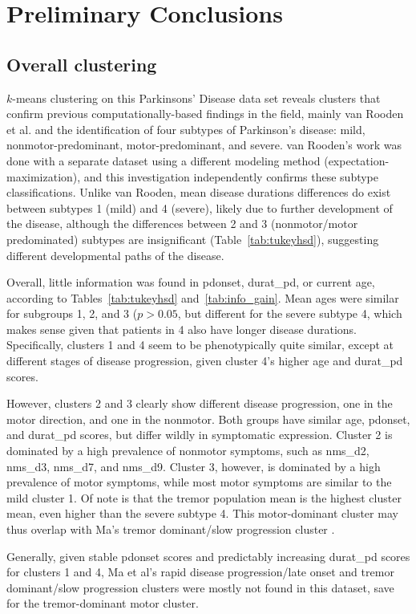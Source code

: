 \documentclass[10pt]{article}
\begin{document}
\section{Preliminary Conclusions}

\subsection{Overall clustering}
$k$-means clustering on this Parkinsons' Disease data set reveals clusters that
confirm previous computationally-based findings in the field, mainly van Rooden
et al. \cite{vanrooden10} and the identification of four subtypes of
Parkinson's disease: mild, nonmotor-predominant, motor-predominant, and severe.
van Rooden's work was done with a separate dataset using a different
modeling method (expectation-maximization), and this investigation
independently confirms these subtype classifications. Unlike van Rooden, mean
disease durations differences do exist between subtypes 1 (mild) and 4
(severe), likely due to further development of the disease, although the
differences between 2 and 3 (nonmotor/motor predominated) subtypes are
insignificant (Table~\ref{tab:tukeyhsd}), suggesting different developmental paths of the disease.

Overall, little information was found in pdonset,
durat\_pd, or current age, according to Tables~\ref{tab:tukeyhsd}
and~\ref{tab:info_gain}.  Mean ages were similar for subgroups 1, 2, and 3 ($p >
0.05$, but different for the severe subtype 4, which makes sense given that
patients in 4 also have longer disease durations. Specifically, clusters 1 and
4 seem to be phenotypically quite similar, except at different stages of
disease progression, given cluster 4's higher age and durat\_pd scores.

However, clusters 2 and 3 clearly show different disease progression, one in
the motor direction, and one in the nonmotor. Both groups have similar age,
pdonset, and durat\_pd scores, but differ wildly in symptomatic expression.
Cluster 2 is dominated by a high prevalence of nonmotor symptoms, such as
nms\_d2, nms\_d3, nms\_d7, and nms\_d9. Cluster 3, however, is dominated by a
high prevalence of motor symptoms, while most motor symptoms are similar to the
mild cluster 1. Of note is that the tremor population mean
is the highest cluster mean, even higher than the severe subtype 4. This
motor-dominant cluster may thus overlap with Ma's tremor dominant/slow
progression cluster \cite{ma15}.

Generally, given stable pdonset scores and predictably increasing durat\_pd
scores for clusters 1 and 4, Ma et al's rapid disease
progression/late onset and tremor dominant/slow progression clusters
\cite{ma15} were mostly not found in this dataset, save for the tremor-dominant
motor cluster.
\end{document}
